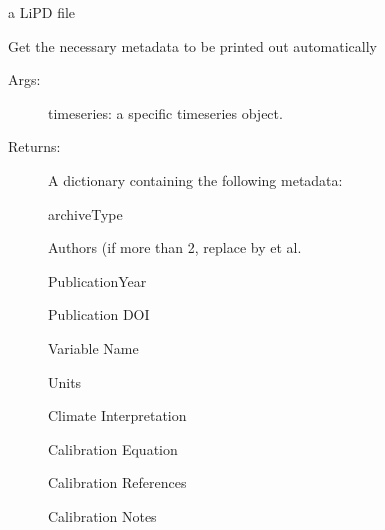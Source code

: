 \documentclass[letterpaper,10pt,english]{sphinxmanual}
\begin{document}
 a LiPD file

\begin{fulllineitems}
\label{\detokenize{SummaryPlots:pyleoclim.SummaryPlots.getMetadata}}
Get the necessary metadata to be printed out automatically
\begin{description}
\item[{Args:}] \leavevmode
timeseries: a specific timeseries object.

\item[{Returns:}] \leavevmode
A dictionary containing the following metadata:

archiveType

Authors (if more than 2, replace by et al.

PublicationYear

Publication DOI

Variable Name

Units

Climate Interpretation

Calibration Equation

Calibration References

Calibration Notes

\end{description}

\end{fulllineitems}

\end{document}
